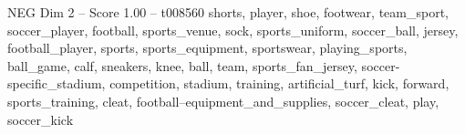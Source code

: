 \begin{textsample}{NEG Dim 2 – Score 1.00 – t008560}  \label{ex:f2_neg_033}
shorts, player, shoe, footwear, team\_sport, soccer\_player, football, sports\_venue, sock, sports\_uniform, soccer\_ball, jersey, football\_player, sports, sports\_equipment, sportswear, playing\_sports, ball\_game, calf, sneakers, knee, ball, team, sports\_fan\_jersey, soccer-specific\_stadium, competition, stadium, training, artificial\_turf, kick, forward, sports\_training, cleat, football--equipment\_and\_supplies, soccer\_cleat, play, soccer\_kick

\end{textsample}
